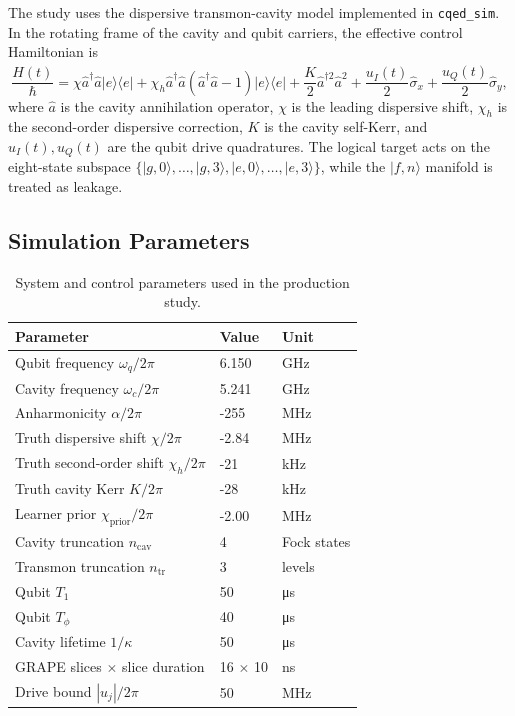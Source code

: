\documentclass[aps,pra,twocolumn,reprint,amsmath,amssymb]{revtex4-2}
\begin{document}
The study uses the dispersive transmon-cavity model implemented in \texttt{cqed\_sim}. In the rotating
frame of the cavity and qubit carriers, the effective control Hamiltonian is
\begin{equation}
\frac{\hat{H}(t)}{\hbar}
= \chi \hat{a}^\dagger \hat{a} |e\rangle \langle e|
+ \chi_h \hat{a}^\dagger \hat{a} (\hat{a}^\dagger \hat{a} - 1) |e\rangle \langle e|
+ \frac{K}{2} \hat{a}^{\dagger 2}\hat{a}^{2}
+ \frac{u_I(t)}{2}\hat{\sigma}_x
+ \frac{u_Q(t)}{2}\hat{\sigma}_y,
\label{eq:hamiltonian}
\end{equation}
where $\hat{a}$ is the cavity annihilation operator, $\chi$ is the leading dispersive shift,
$\chi_h$ is the second-order dispersive correction, $K$ is the cavity self-Kerr, and
$u_I(t), u_Q(t)$ are the qubit drive quadratures. The logical target acts on the eight-state
subspace $\{|g,0\rangle,\dots,|g,3\rangle,|e,0\rangle,\dots,|e,3\rangle\}$, while the
$|f,n\rangle$ manifold is treated as leakage.

\subsection{Simulation Parameters}

\begin{table}[tp]
\centering
\caption{System and control parameters used in the production study.}
\begin{tabular}{@{} l l l @{}}
\toprule
Parameter & Value & Unit \\
\midrule
Qubit frequency $\omega_q / 2\pi$ & 6.150 & GHz \\
Cavity frequency $\omega_c / 2\pi$ & 5.241 & GHz \\
Anharmonicity $\alpha / 2\pi$ & -255 & MHz \\
Truth dispersive shift $\chi / 2\pi$ & -2.84 & MHz \\
Truth second-order shift $\chi_h / 2\pi$ & -21 & kHz \\
Truth cavity Kerr $K / 2\pi$ & -28 & kHz \\
Learner prior $\chi_{\mathrm{prior}} / 2\pi$ & -2.00 & MHz \\
Cavity truncation $n_{\mathrm{cav}}$ & 4 & Fock states \\
Transmon truncation $n_{\mathrm{tr}}$ & 3 & levels \\
Qubit $T_1$ & 50 & \si{\micro\second} \\
Qubit $T_\phi$ & 40 & \si{\micro\second} \\
Cavity lifetime $1/\kappa$ & 50 & \si{\micro\second} \\
GRAPE slices $\times$ slice duration & 16 $\times$ 10 & ns \\
Drive bound $|u_j| / 2\pi$ & 50 & MHz \\
\bottomrule
\end{tabular}
\end{table}
\end{document}
